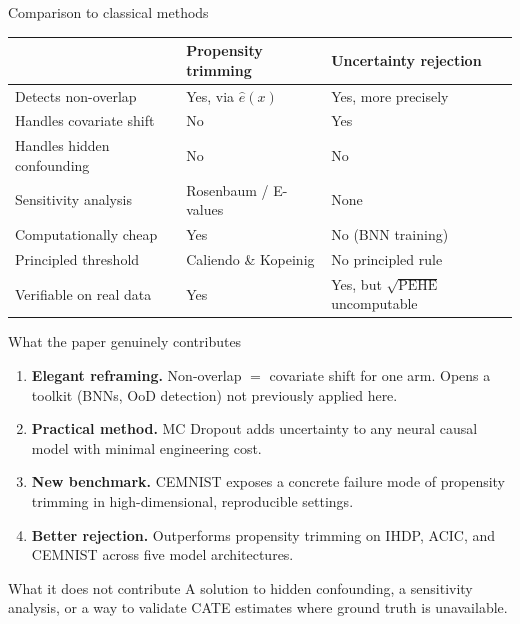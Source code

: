 \documentclass[aspectratio=169]{beamer}
\begin{document}
\begin{frame}{Comparison to classical methods}

\begin{center}
\small
\renewcommand{\arraystretch}{1.4}
\begin{tabular}{p{3.5cm}p{4cm}p{4cm}}
\toprule
 & \textbf{Propensity trimming} & \textbf{Uncertainty rejection} \\
\midrule
Detects non-overlap & Yes, via $\hat e(x)$ & Yes, more precisely \\
Handles covariate shift & No & Yes \\
Handles hidden confounding & No & No \\
Sensitivity analysis & Rosenbaum / E-values & None \\
Computationally cheap & Yes & No (BNN training) \\
Principled threshold & Caliendo \& Kopeinig & No principled rule \\
Verifiable on real data & Yes & Yes, but $\sqrt{\mathrm{PEHE}}$ uncomputable \\
\bottomrule
\end{tabular}
\end{center}
\end{frame}

\begin{frame}{What the paper genuinely contributes}

\begin{enumerate}
  \item \textbf{Elegant reframing.}
        Non-overlap $=$ covariate shift for one arm.
        Opens a toolkit (BNNs, OoD detection) not previously applied here.

  \item \textbf{Practical method.}
        MC Dropout adds uncertainty to any neural causal model
        with minimal engineering cost.

  \item \textbf{New benchmark.}
        CEMNIST exposes a concrete failure mode of propensity trimming
        in high-dimensional, reproducible settings.

  \item \textbf{Better rejection.}
        Outperforms propensity trimming on IHDP, ACIC, and CEMNIST
        across five model architectures.
\end{enumerate}

\bigskip
\begin{block}{What it does not contribute}
A solution to hidden confounding, a sensitivity analysis, or a way to
validate CATE estimates where ground truth is unavailable.
\end{block}
\end{frame}
\end{document}
